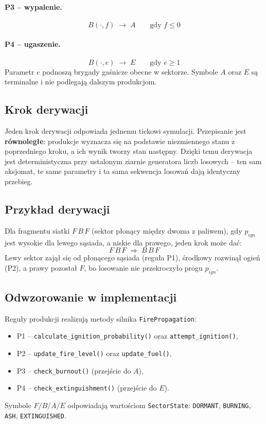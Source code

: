 \documentclass[11pt,a4paper]{article}
\begin{document}
\paragraph{P3 -- wypalenie.}
\begin{equation}
B(\cdot, f) \;\rightarrow\; A \qquad \text{gdy } f \le 0
\end{equation}

\paragraph{P4 -- ugaszenie.}
\begin{equation}
B(\cdot, e) \;\rightarrow\; E \qquad \text{gdy } e \ge 1
\end{equation}
Parametr $e$ podnoszą brygady gaśnicze obecne w sektorze. Symbole $A$ oraz $E$ są terminalne i nie podlegają dalszym produkcjom.

\subsection{Krok derywacji}

Jeden krok derywacji odpowiada jednemu tickowi symulacji. Przepisanie jest \textbf{równoległe}: produkcje wyznacza się na podstawie niezmiennego stanu z poprzedniego kroku, a ich wynik tworzy stan następny. Dzięki temu derywacja jest deterministyczna przy ustalonym ziarnie generatora liczb losowych -- ten sam aksjomat, te same parametry i ta sama sekwencja losowań dają identyczny przebieg.

\subsection{Przykład derywacji}

Dla fragmentu siatki $F\,B\,F$ (sektor płonący między dwoma z paliwem), gdy $p_{ign}$ jest wysokie dla lewego sąsiada, a niskie dla prawego, jeden krok może dać:
\begin{equation}
F\,B\,F \;\Longrightarrow\; B\,B\,F
\end{equation}
Lewy sektor zajął się od płonącego sąsiada (reguła P1), środkowy rozwinął ogień (P2), a prawy pozostał $F$, bo losowanie nie przekroczyło progu $p_{ign}$.

\subsection{Odwzorowanie w implementacji}

Reguły produkcji realizują metody silnika \texttt{FirePropagation}:
\begin{itemize}
  \item P1 -- \texttt{calculate\_ignition\_probability()} oraz \texttt{attempt\_ignition()},
  \item P2 -- \texttt{update\_fire\_level()} oraz \texttt{update\_fuel()},
  \item P3 -- \texttt{check\_burnout()} (przejście do $A$),
  \item P4 -- \texttt{check\_extinguishment()} (przejście do $E$).
\end{itemize}
Symbole $F/B/A/E$ odpowiadają wartościom \texttt{SectorState}: \texttt{DORMANT}, \texttt{BURNING}, \texttt{ASH}, \texttt{EXTINGUISHED}.
\end{document}
